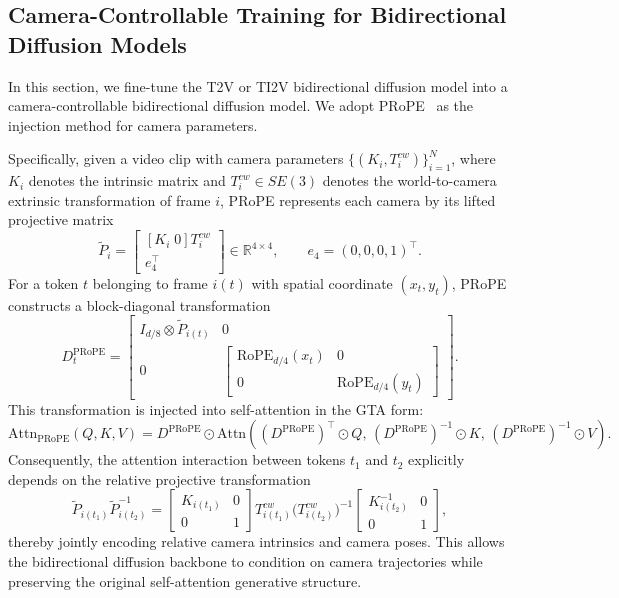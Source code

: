 \documentclass{llmxive}
\begin{document}
\subsection{Camera-Controllable Training for Bidirectional Diffusion Models}
\label{sec: method-bidirectional}

In this section, we fine-tune the T2V or TI2V bidirectional diffusion model into a camera-controllable bidirectional diffusion model. We adopt PRoPE~\cite{li2026cameras} as the injection method for camera parameters.

Specifically, given a video clip with camera parameters 
$\{(K_i,T_i^{cw})\}_{i=1}^{N}$, where $K_i$ denotes the intrinsic matrix and 
$T_i^{cw}\in SE(3)$ denotes the world-to-camera extrinsic transformation of frame $i$, PRoPE represents each camera by its lifted projective matrix
\[
\widetilde P_i=
\begin{bmatrix}
[K_i\;0]T_i^{cw}\\
e_4^\top
\end{bmatrix}\in\mathbb{R}^{4\times 4},
\qquad
e_4=(0,0,0,1)^\top .
\]
For a token $t$ belonging to frame $i(t)$ with spatial coordinate $(x_t,y_t)$, PRoPE constructs a block-diagonal transformation
\[
D_t^{\mathrm{PRoPE}}
=
\begin{bmatrix}
I_{d/8}\otimes \widetilde P_{i(t)} & 0\\
0 &
\begin{bmatrix}
\mathrm{RoPE}_{d/4}(x_t)&0\\
0&\mathrm{RoPE}_{d/4}(y_t)
\end{bmatrix}
\end{bmatrix}.
\]
This transformation is injected into self-attention in the GTA form:
\[
\mathrm{Attn}_{\mathrm{PRoPE}}(Q,K,V)
=
D^{\mathrm{PRoPE}}\odot
\mathrm{Attn}\!\left(
(D^{\mathrm{PRoPE}})^\top\odot Q,\,
(D^{\mathrm{PRoPE}})^{-1}\odot K,\,
(D^{\mathrm{PRoPE}})^{-1}\odot V
\right).
\]
Consequently, the attention interaction between tokens $t_1$ and $t_2$ explicitly depends on the relative projective transformation
\[
\widetilde P_{i(t_1)}\widetilde P_{i(t_2)}^{-1}
=
\begin{bmatrix}
K_{i(t_1)}&0\\
0&1
\end{bmatrix}
T_{i(t_1)}^{cw}
\bigl(T_{i(t_2)}^{cw}\bigr)^{-1}
\begin{bmatrix}
K_{i(t_2)}^{-1}&0\\
0&1
\end{bmatrix},
\]
thereby jointly encoding relative camera intrinsics and camera poses. This allows the bidirectional diffusion backbone to condition on camera trajectories while preserving the original self-attention generative structure.
\end{document}

